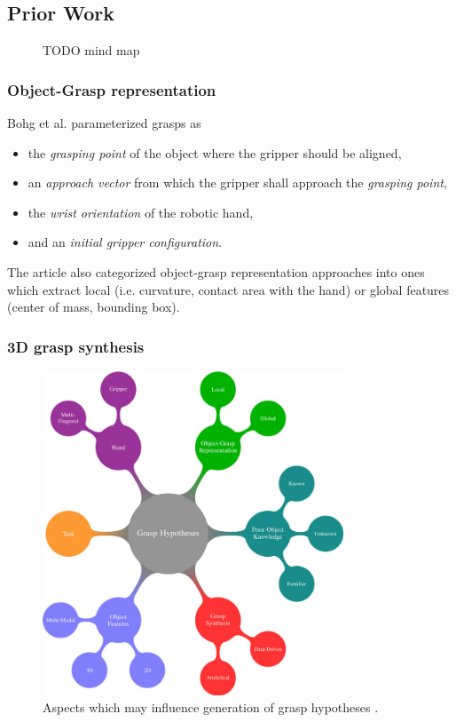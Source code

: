 \documentclass[12pt]{article}
\begin{document}
    \subsection{Prior Work}
    \begin{figure}[h!]
        \centering
        \caption{TODO mind map}
        \label{fig:mindmap}
    \end{figure}

	\subsubsection{Object-Grasp representation}
	Bohg et al. \cite{Bohg2014} parameterized grasps as
	\begin{itemize}
		\item the \emph{grasping point} of the object where the gripper should be aligned,
		\item an \emph{approach vector} from which the gripper shall approach the \emph{grasping point},
		\item the \emph{wrist orientation} of the robotic hand,
		\item and an \emph{initial gripper configuration}.
	\end{itemize}
	The article also categorized object-grasp representation approaches into ones which extract local (i.e. curvature, contact area with the hand) or global features (center of mass, bounding box).

    \subsubsection{3D grasp synthesis}
    
    \begin{figure}[H]
    	\centering
    	\includegraphics[width=0.8\textwidth]{bohg14-grasp_synthesis_mind_map}
    	\caption{Aspects which may influence generation of grasp hypotheses \cite{Bohg2014}.}
    	\label{fig:grasp_synthesis_mind_map}
    \end{figure}
    
\end{document}
